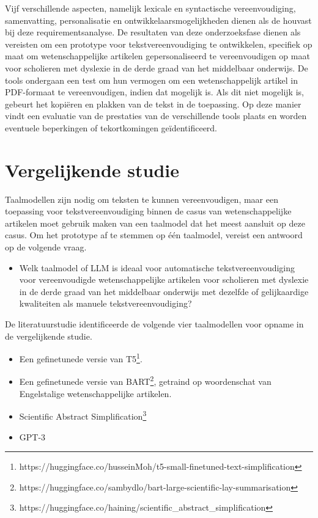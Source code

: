 Vijf verschillende aspecten, namelijk lexicale en syntactische vereenvoudiging, samenvatting, personalisatie en ontwikkelaarsmogelijkheden dienen als de houvast bij deze requirementsanalyse. De resultaten van deze onderzoeksfase dienen als vereisten om een prototype voor tekstvereenvoudiging te ontwikkelen, specifiek op maat om wetenschappelijke artikelen gepersonaliseerd te vereenvoudigen op maat voor scholieren met dyslexie in de derde graad van het middelbaar onderwijs. De tools ondergaan een test om hun vermogen om een wetenschappelijk artikel in PDF-formaat te vereenvoudigen, indien dat mogelijk is. Als dit niet mogelijk is, gebeurt het kopiëren en plakken van de tekst in de toepassing. Op deze manier vindt een evaluatie van de prestaties van de verschillende tools plaats en worden eventuele beperkingen of tekortkomingen geïdentificeerd.

\section{Vergelijkende studie}
\label{sec:vergelijkende-studie}

Taalmodellen zijn nodig om teksten te kunnen vereenvoudigen, maar een toepassing voor tekstvereenvoudiging binnen de casus van wetenschappelijke artikelen moet gebruik maken van een taalmodel dat het meest aansluit op deze casus. Om het prototype af te stemmen op één taalmodel, vereist een antwoord op de volgende vraag. 

\begin{itemize}
	\item Welk taalmodel of LLM is ideaal voor automatische tekstvereenvoudiging voor vereenvoudigde wetenschappelijke artikelen voor scholieren met dyslexie in de derde graad van het middelbaar onderwijs met dezelfde of gelijkaardige kwaliteiten als manuele tekstvereenvoudiging?
\end{itemize}

De literatuurstudie identificeerde de volgende vier taalmodellen voor opname in de vergelijkende studie.

\begin{itemize}
	\item Een gefinetunede versie van T5\footnote{https://huggingface.co/husseinMoh/t5-small-finetuned-text-simplification}.
	\item Een gefinetunede versie van BART\footnote{https://huggingface.co/sambydlo/bart-large-scientific-lay-summarisation}, getraind op woordenschat van Engelstalige wetenschappelijke artikelen.
	\item Scientific Abstract Simplification\footnote{https://huggingface.co/haining/scientific\_abstract\_simplification}
	\item GPT-3
\end{itemize}



